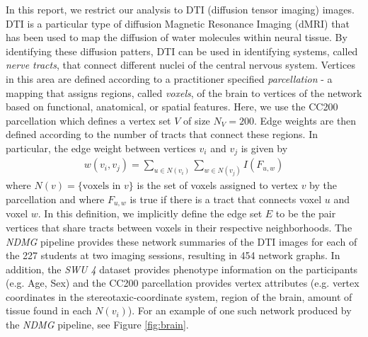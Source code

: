 \documentclass[01pt]{article}
\begin{document}
In this report, we restrict our analysis to DTI (diffusion tensor imaging) images. 
DTI is a particular type of diffusion Magnetic Resonance Imaging (dMRI) that has been used to map the diffusion of water molecules within neural tissue. 
By identifying these diffusion patters, DTI can be used in identifying systems, called \textit{nerve tracts}, that connect different nuclei of the central nervous system\cite{Soares2013}. 
Vertices in this area are defined according to a practitioner specified \textit{parcellation} - a mapping that assigns regions, called \textit{voxels}, of the brain to vertices of the network based on functional, anatomical, or spatial features.
Here, we use the CC200 parcellation \cite{Craddock2012} which defines a vertex set $V$ of size $N_V = 200$.
Edge weights are then defined according to the number of tracts that connect these regions. 
In particular, the edge weight between vertices $v_i$ and $v_j$ is given by 
\begin{align}
    w(v_i, v_j) = \sum_{u\in N(v_i)}\sum_{w\in N(v_j)} I(F_{u,w})
\end{align}
where $N(v) = \{\text{voxels in $v$}\}$ is the set of voxels assigned to vertex $v$ by the parcellation and where $F_{u,w}$ is true if there is a tract that connects voxel $u$ and voxel $w$. 
In this definition, we implicitly define the edge set $E$ to be the pair vertices that share tracts between voxels in their respective neighborhoods. 
The \textit{NDMG} pipeline provides these network summaries of the DTI images for each of the 227 students at two imaging sessions, resulting in 454 network graphs. In addition, the \textit{SWU 4} dataset provides phenotype information on the participants (e.g. Age, Sex) and the CC200 parcellation provides vertex attributes (e.g. vertex coordinates in the stereotaxic-coordinate system, region of the brain, amount of tissue found in each $N(v_i)$). 
For an example of one such network produced by the \textit{NDMG} pipeline, see Figure \ref{fig:brain}. 
\end{document}
